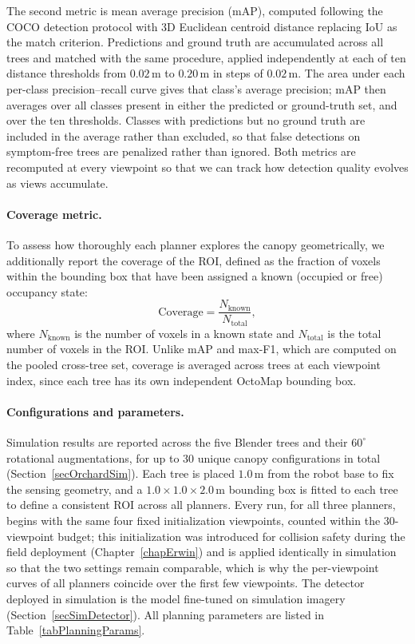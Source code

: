 The second metric is mean average precision (mAP), computed following the
COCO detection protocol with 3D Euclidean centroid distance replacing IoU
as the match criterion.
Predictions and ground truth are accumulated across all trees and matched
with the same procedure, applied independently at each of ten distance
thresholds from $0.02$\,m to $0.20$\,m in steps of $0.02$\,m.
The area under each per-class precision--recall curve gives that class's
average precision; mAP then averages over all classes present in either the
predicted or ground-truth set, and over the ten thresholds.
Classes with predictions but no ground truth are included in the average
rather than excluded, so that false detections on symptom-free trees are
penalized rather than ignored.
Both metrics are recomputed at every viewpoint so that we can track how
detection quality evolves as views accumulate.

\paragraph{Coverage metric.}
To assess how thoroughly each planner explores the canopy geometrically, we
additionally report the coverage of the ROI, defined as the fraction of
voxels within the bounding box that have been assigned a known (occupied or
free) occupancy state:
\begin{equation}
\text{Coverage} = \frac{N_{\text{known}}}{N_{\text{total}}},
\label{eqCoverage}
\end{equation}
where $N_{\text{known}}$ is the number of voxels in a known state and
$N_{\text{total}}$ is the total number of voxels in the ROI.
Unlike mAP and max-F1, which are computed on the pooled cross-tree set,
coverage is averaged across trees at each viewpoint index, since each tree
has its own independent OctoMap bounding box.

\paragraph{Configurations and parameters.}
Simulation results are reported across the five Blender trees and their
$60^\circ$ rotational augmentations, for up to $30$ unique canopy
configurations in total (Section~\ref{secOrchardSim}).
Each tree is placed $1.0$\,m from the robot base to fix the sensing
geometry, and a $1.0 \times 1.0 \times 2.0$\,m bounding box is fitted to
each tree to define a consistent ROI across all planners.
Every run, for all three planners, begins with the same four fixed
initialization viewpoints, counted within the $30$-viewpoint budget;
this initialization was introduced for collision safety during the field
deployment (Chapter~\ref{chapErwin}) and is applied identically in
simulation so that the two settings remain comparable, which is why the
per-viewpoint curves of all planners coincide over the first few
viewpoints.
The detector deployed in simulation is the model fine-tuned on simulation
imagery (Section~\ref{secSimDetector}).
All planning parameters are listed in Table~\ref{tabPlanningParams}.

